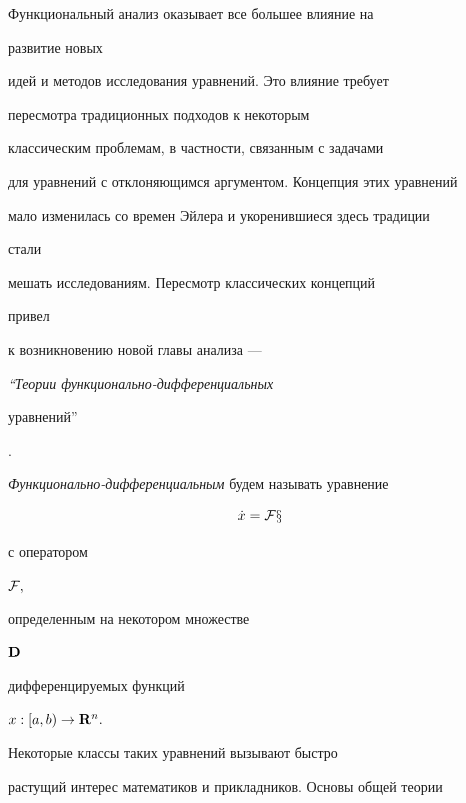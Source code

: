 \date{}


\pagestyle{plain}








\maketitle





Функциональный анализ оказывает все большее влияние на


развитие новых


идей и методов исследования уравнений. Это влияние требует


пересмотра традиционных подходов к некоторым


классическим проблемам, в частности, связанным с задачами


для уравнений с отклоняющимся аргументом. Концепция этих уравнений


мало изменилась со времен Эйлера и укоренившиеся здесь традиции


стали


мешать исследованиям. Пересмотр классических концепций


привел


к возникновению новой главы анализа ---


{\it ``Теории  функционально-дифференциальных


уравнений''}.





{\it Функционально-дифференциальным} будем называть уравнение


\begin{equation}


\Dot x  = \cal F x


\end{equation}


с оператором


$\cal F,$


определенным на некотором множестве


$\bold D$


дифференцируемых функций


$x: [a,b)\to\bold R^n.$


Некоторые классы таких уравнений вызывают быстро


растущий интерес математиков и прикладников. Основы общей теории


